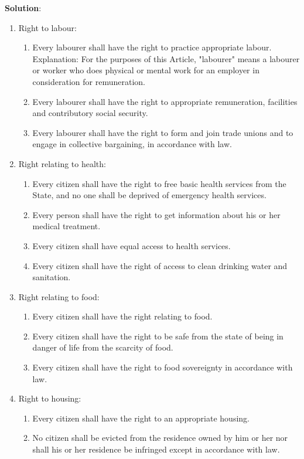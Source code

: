 \documentclass[
  openany]{book}
\newenvironment{solution}{ {\bfseries Solution}:}{}
\begin{document}
\begin{questions}
\begin{solution}
\begin{enumerate}
\item Right to labour:
\begin{enumerate}
\item Every labourer shall have the right to practice appropriate labour. Explanation: For the purposes of this Article, "labourer" means a labourer or worker who does physical or mental work for an employer in consideration for remuneration.
\item Every labourer shall have the right to appropriate remuneration, facilities and contributory social security.
\item Every labourer shall have the right to form and join trade unions and to engage in collective bargaining, in accordance with law.
\end{enumerate}

\item Right relating to health:
\begin{enumerate}
\item Every citizen shall have the right to free basic health services from the State, and no one shall be deprived of emergency health services.
\item Every person shall have the right to get information about his or her medical treatment.
\item Every citizen shall have equal access to health services.
\item Every citizen shall have the right of access to clean drinking water and sanitation.
\end{enumerate}

\item Right relating to food:
\begin{enumerate}
\item Every citizen shall have the right relating to food.
\item Every citizen shall have the right to be safe from the state of being in danger of life from the scarcity of food.
\item Every citizen shall have the right to food sovereignty in accordance with law.
\end{enumerate}

\item Right to housing:
\begin{enumerate}
\item Every citizen shall have the right to an appropriate housing.
\item No citizen shall be evicted from the residence owned by him or her nor shall his or her residence be infringed except in accordance with law.
\end{enumerate}


\end{enumerate}
\end{solution}
\end{questions}
\end{document}
